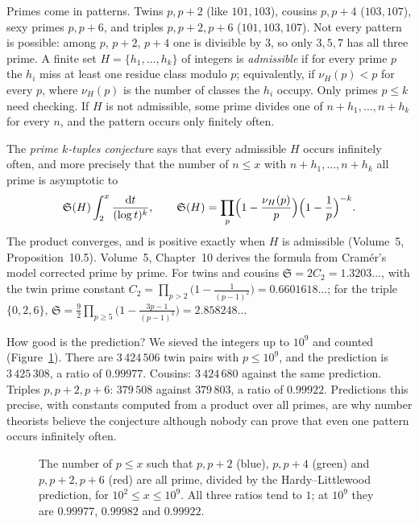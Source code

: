 Primes come in patterns. Twins $p,p+2$ (like $101,103$), cousins $p,p+4$ ($103,107$), sexy primes $p,p+6$, and triples $p,p+2,p+6$ ($101,103,107$).
Not every pattern is possible: among $p$, $p+2$, $p+4$ one is divisible by $3$, so only $3,5,7$ has all three prime. A finite set
$H=\{h_1,\dots,h_k\}$ of integers is \emph{admissible} if for every prime $p$ the $h_i$ miss at least one residue class modulo $p$; equivalently,
if $\nu_H(p)<p$ for every $p$, where $\nu_H(p)$ is the number of classes the $h_i$ occupy. Only primes $p\le k$ need checking. If $H$ is not
admissible, some prime divides one of $n+h_1,\dots,n+h_k$ for every $n$, and the pattern occurs only finitely often.

\begin{remark}
The \emph{prime $k$-tuples conjecture} says that every admissible $H$ occurs infinitely often, and more precisely that the number of $n\le x$ with
$n+h_1,\dots,n+h_k$ all prime is asymptotic to
\[
\mathfrak S(H)\int_2^x\frac{\mathrm dt}{(\log t)^k},\qquad\mathfrak S(H)=\prod_p\Bigl(1-\frac{\nu_H(p)}p\Bigr)\Bigl(1-\frac1p\Bigr)^{-k}.
\]
The product converges, and is positive exactly when $H$ is admissible (Volume~5, Proposition~10.5). Volume~5, Chapter~10 derives the formula from
Cram\'er's model corrected prime by prime. For twins and cousins $\mathfrak S=2C_2=1.3203\ldots$, with the twin prime constant
$C_2=\prod_{p>2}\bigl(1-\frac1{(p-1)^2}\bigr)=0.6601618\ldots$; for the triple $\{0,2,6\}$, $\mathfrak S=\frac92\prod_{p\ge5}\bigl(1-\frac{3p-1}{(p-1)^3}\bigr)=2.858248\ldots$
\end{remark}

How good is the prediction? We sieved the integers up to $10^9$ and counted (Figure~\ref{conjectures:fig:tuples}). There are $3\,424\,506$ twin pairs with
$p\le10^9$, and the prediction is $3\,425\,308$, a ratio of $0.99977$. Cousins: $3\,424\,680$ against the same prediction. Triples $p,p+2,p+6$: $379\,508$ against
$379\,803$, a ratio of $0.99922$. Predictions this precise, with constants computed from a product over all primes, are why number theorists believe
the conjecture although nobody can prove that even one pattern occurs infinitely often.

\begin{figure}[ht]
\centering
{}
\caption{The number of $p\le x$ such that $p,p+2$ (blue), $p,p+4$ (green) and $p,p+2,p+6$ (red) are all prime, divided by the Hardy--Littlewood
prediction, for $10^2\le x\le10^9$. All three ratios tend to $1$; at $10^9$ they are $0.99977$, $0.99982$ and $0.99922$.}
\label{conjectures:fig:tuples}
\end{figure}

